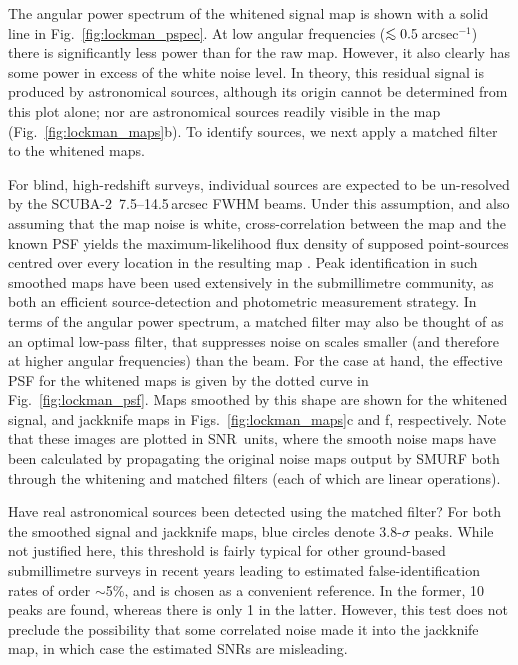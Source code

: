 \documentclass[useAMS,usenatbib,nofootinbib]{mn2e}
\newcommand{\snr}{SNR}
\newcommand{\scuba}{SCUBA-2}
\def\lsim{\mathrel{\lower2.5pt\vbox{\lineskip=0pt\baselineskip=0pt
          \hbox{$<$}\hbox{$\sim$}}}}
\begin{document}
The angular power spectrum of the whitened signal map is shown with a
solid line in Fig.~\ref{fig:lockman_pspec}. At low angular frequencies
($\lsim 0.5$\,arcsec$^{-1}$) there is significantly less power than
for the raw map. However, it also clearly has some power in excess of
the white noise level. In theory, this residual signal is produced by
astronomical sources, although its origin cannot be determined from
this plot alone; nor are astronomical sources readily visible in the
map (Fig.~\ref{fig:lockman_maps}b). To identify sources, we next apply
a matched filter to the whitened maps.

For blind, high-redshift surveys, individual sources are expected to
be un-resolved by the \scuba\ 7.5--14.5\,arcsec FWHM beams. Under this
assumption, and also assuming that the map noise is white,
cross-correlation between the map and the known PSF yields the
maximum-likelihood flux density of supposed point-sources centred over
every location in the resulting map \citep[an extremely well-known
result throughout astronomy, see][]{stetson1987}. Peak identification
in such smoothed maps have been used extensively in the submillimetre
community, as both an efficient source-detection and photometric
measurement strategy. In terms of the angular power spectrum, a
matched filter may also be thought of as an optimal low-pass filter,
that suppresses noise on scales smaller (and therefore at higher
angular frequencies) than the beam. For the case at hand, the
effective PSF for the whitened maps is given by the dotted curve in
Fig.~\ref{fig:lockman_psf}. Maps smoothed by this shape are shown for
the whitened signal, and jackknife maps in
Figs.~\ref{fig:lockman_maps}c and f, respectively. Note that these
images are plotted in \snr\ units, where the smooth noise maps have
been calculated by propagating the original noise maps output by SMURF
both through the whitening and matched filters (each of which are
linear operations).

Have real astronomical sources been detected using the matched filter?
For both the smoothed signal and jackknife maps, blue circles denote
3.8-$\sigma$ peaks. While not justified here, this threshold is fairly
typical for other ground-based submillimetre surveys in recent years
\citep[e.g.,][]{coppin2006,perera2008,2009ApJ...707.1201W} leading to
estimated false-identification rates of order $\sim$5\%, and is chosen
as a convenient reference. In the former, 10 peaks are found, whereas
there is only 1 in the latter. However, this test does not preclude
the possibility that some correlated noise made it into the jackknife
map, in which case the estimated \snr s are misleading.
\end{document}
